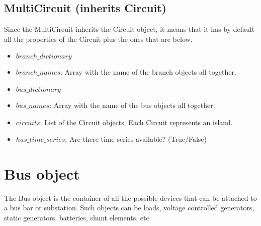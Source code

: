 \documentclass[11pt,fleqn]{book} %
\begin{document}
\subsection{MultiCircuit (inherits Circuit)}

Since the MultiCircuit inherits the Circuit object, it means that it has by default all the properties of the Circuit plus the ones that are below.

\begin{itemize}
	\item $branch\_dictionary$
	\item $branch\_names$: Array with the name of the branch objects all together.
	\item $bus\_dictionary$
	\item $bus\_names$: Array with the name of the bus objects all together.
	\item $circuits$: List of the Circuit objects. Each Circuit represents an island.
	\item $has\_time\_series$: Are there time series available? (True/False)
\end{itemize}


\section{Bus object}

The Bus object is the container of all the possible devices that can be attached to a bus bar or substation. Such objects can be loads, voltage controlled generators, static generators, batteries, shunt elements, etc.
\end{document}
